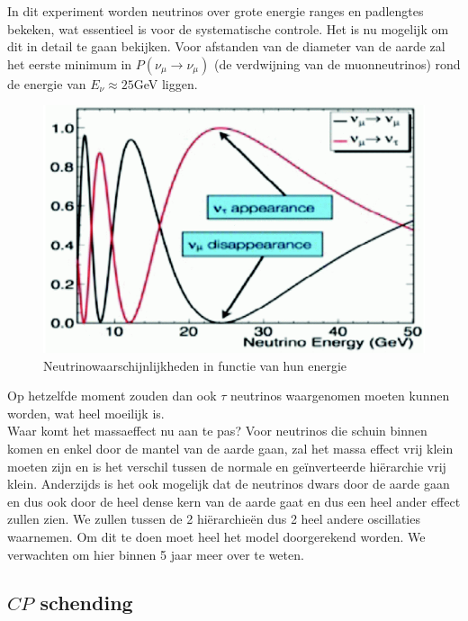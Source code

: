 \documentclass[../main.tex]{subfiles}
\begin{document}
In dit experiment worden neutrinos over grote energie ranges en padlengtes bekeken, wat essentieel is voor de systematische controle. Het is nu mogelijk om dit in detail te gaan bekijken. Voor afstanden van de diameter van de aarde zal het eerste minimum in $P\left(\nu_{\mu} \rightarrow \nu_{\mu}\right)$ (de verdwijning van de muonneutrinos) rond de energie van $E_\nu \approx 25$GeV liggen.

\begin{figure}[h]
    \centering
    \includegraphics[width=0.5\linewidth]{neutrinos/muon_tau_neutr_osc.png}
    \caption{Neutrinowaarschijnlijkheden in functie van hun energie}%
    \label{fig:neutrino}
\end{figure}

Op hetzelfde moment zouden dan ook $\tau$ neutrinos waargenomen moeten kunnen worden, wat heel moeilijk is.\\
Waar komt het massaeffect nu aan te pas? Voor neutrinos die schuin binnen komen en enkel door de mantel van de aarde gaan, zal het massa effect vrij klein moeten zijn en is het verschil tussen de normale en geïnverteerde hiërarchie vrij klein. Anderzijds is het ook mogelijk dat de neutrinos dwars door de aarde gaan en dus ook door de heel dense kern van de aarde gaat en dus een heel ander effect zullen zien. We zullen tussen de 2 hiërarchieën dus 2 heel andere oscillaties waarnemen. Om dit te doen moet heel het model doorgerekend worden. We verwachten om hier binnen 5 jaar meer over te weten.

\subsection{$CP$ schending}%
\label{sub:_cp_schending_neutrinos}
\end{document}
